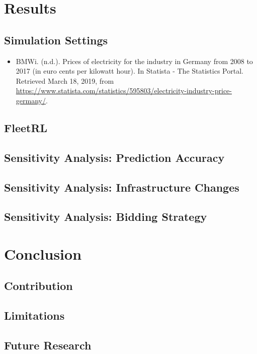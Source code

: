 \documentclass[a4paper, 12pt]{article}
\begin{document}
\clearpage
\section{Results}
\label{sec:org01504fd}
\subsection{Simulation Settings}
\label{sec:orgd62c186}
\begin{itemize}
\item BMWi. (n.d.). Prices of electricity for the industry in Germany from 2008 to
2017 (in euro cents per kilowatt hour). In Statista - The Statistics Portal.
Retrieved March 18, 2019, from
\url{https://www.statista.com/statistics/595803/electricity-industry-price-germany/}.
\end{itemize}
\subsection{FleetRL}
\label{sec:org9306f0e}

\subsection{Sensitivity Analysis: Prediction Accuracy}
\label{sec:org02ff4b6}
\subsection{Sensitivity Analysis: Infrastructure Changes}
\label{sec:orga134d9e}
\subsection{Sensitivity Analysis: Bidding Strategy}
\label{sec:org0d1a9aa}
\section{Conclusion}
\label{sec:org30748f3}
\subsection{Contribution}
\label{sec:orgde7ece4}

\subsection{Limitations}
\label{sec:org42da9d6}
\subsection{Future Research}
\label{sec:org7e4393a}


\clearpage


\end{document}
